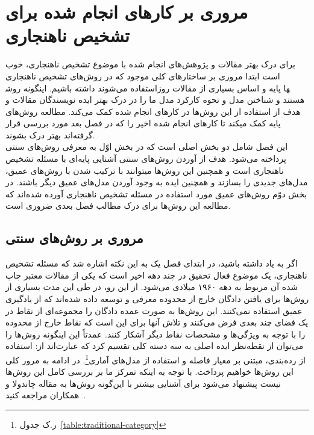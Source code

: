 \documentclass[12pt,a4paper]{report}
\theoremstyle{definition}
\theoremstyle{definition}
\begin{document}
\chapter{مروری بر کارهای انجام شده برای تشخیص ناهنجاری}

برای درک بهتر مقالات و پژوهش‌های انجام شده با موضوع تشخیص ناهنجاری، خوب است ابتدا مروری بر ساختار‌های کلی موجود که در روش‌های تشخیص ناهنجاری استفاده می‌شوند داشته باشیم. اینگونه روش‎ها پایه و اساس بسیاری از مقالات روز هستند و شناختن مدل و نحوه کارکرد مدل ما را در درک بهتر ایده نویسندگان مقالات و هدف از استفاده از این روش‌ها در کارهای انجام شده کمک می‌کند. مطالعه روش‌های پایه کمک میکند تا کارهای انجام شده اخیر را که در فصل بعد مورد بررسی قرار گرفته‌اند بهتر درک بشوند. \\

این فصل شامل دو بخش اصلی است که در بخش اوّل به معرفی روش‌های سنتی پرداخته می‌شود. هدف از آوردن روش‌های سنتی آشنایی پایه‌ای با مسئله تشخیص ناهنجاری است و همچنین این روش‌ها میتوانند با ترکیب شدن با روش‌های عمیق،‌ مدل‌های جدیدی را بسازند و همچنین ایده به وجود آوردن مدل‌های عمیق دیگر باشند. در بخش دوّم روش‌های عمیق مورد استفاده در مسئله تشخیص ناهنجاری آورده شده‌اند که مطالعه این روش‌ها برای درک مطالب فصل بعدی ضروری است.
\section{مروری بر روش‌های سنتی}
	اگر به‌ یاد داشته باشید، در ابتدای فصل یک به این نکته اشاره شد که مسئله تشخیص ناهنجاری، یک موضوع فعال تحقیق در چند دهه اخیر است که یکی از مقالات معتبر چاپ شده آن مربوط به دهه ۱۹۶۰ میلادی می‌شود. از این رو، در طی این مدت بسیاری از روش‌ها برای یافتن دادگان خارج از محدوده معرفی و توسعه داده شده‌اند که از یادگیری عمیق استفاده نمی‌کنند. این روش‌ها به صورت عمده دادگان را مجموعه‌ای از نقاط در یک فضای چند بعدی فرض می‌کنند و تلاش آنها برای این است که نقاط خارج از محدوده را با توجه به ویژگی‌ها و مشخصات نقاط دیگر آشکار کنند. عمدتاً این اینگونه روش‌ها را می‌توان از نقطه‌نظر ایده اصلی به سه دسته کلی تقسیم کرد که عبارت‌اند از: استفاده از رده‌بندی، مبتنی بر معیار فاصله و استفاده از مدل‌های آماری\footnote{ر.ک جدول~\ref{table:traditional-category}}. در ادامه به مرور کلی این روش‌ها خواهیم پرداخت. با توجه به اینکه تمرکز ما بر بررسی کامل این روش‌ها نیست پیشنهاد می‌شود برای آشنایی بیشتر با این‌گونه روش‌ها به مقاله چاندولا و همکاران مراجعه کنید~\cite{V.Chandola}.
	
\end{document}
